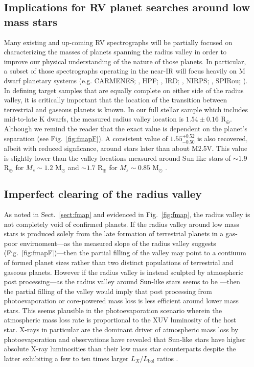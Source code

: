 \documentclass[twocolumn]{emulateapj}
\begin{document}
\subsection{Implications for RV planet searches around low mass stars}
Many existing and up-coming RV spectrographs
will be partially focused on characterizing the masses of planets spanning the radius valley in order to
improve our physical understanding of the nature of those planets. In particular, a subset of those spectrographs
operating in the near-IR will focus heavily on M dwarf planetary systems
(e.g. CARMENES; \citealt{quirrenbach14}, HPF; \citealt{mahadevan12}, IRD; \citealt{kotani14},
NIRPS; \citealt{bouchy17}, SPIRou; \citealt{donati18}). In defining target samples
that are equally complete on either side of the radius valley, it is critically important that the location
of the transition between terrestrial and gaseous planets is known. In our full stellar sample which includes
mid-to-late K dwarfs, the measured radius valley location is $1.54\pm 0.16$ R$_{\oplus}$. Although we remind the
reader that the exact value is dependent on the planet's separation (see Fig.~\ref{fig:fmapF}). A consistent value of
$1.55^{+0.52}_{-0.50}$ is also recovered, albeit with reduced signficance, around stars later than about M2.5V.
This value is slightly lower than the valley locations measured around Sun-like stars of
$\sim 1.9$ R$_{\oplus}$ for $M_s \sim 1.2$ M$_{\odot}$ and $\sim 1.7$ R$_{\oplus}$ for $M_s \sim 0.85$ M$_{\odot}$
\citep{fulton18}.

\subsection{Imperfect clearing of the radius valley} \label{sect:void}
As noted in Sect.~\ref{sect:fmap} and evidenced in Fig.~\ref{fig:fmap}, the radius valley is not completely
void of confirmed planets. If the radius valley around low mass stars is produced solely from the late formation
of terrestrial planets in a gas-poor envirnoment---as the measured slope of the radius valley suggests
(Fig.~\ref{fig:fmapF})---then the partial filling of the valley may point to a contiuum of formed planet sizes
rather than two distinct populations of terrestrial and gaseous planets. However if the radius valley is instead
sculpted by atmospheric post processing---as the radius valley around Sun-like stars seems to be
\citep{fulton17,fulton18,vaneylen18,martinez19}---then the partial filling of the valley would imply that post
processing from photoevaporation or core-powered mass loss is less efficient around lower mass stars.
This seems plausible in the photoevaporation scenario wherein the atmospheric mass loss rate is proportional to
the XUV luminosity of the host star. X-rays in particular are the dominant driver of atmospheric mass loss by
photoevaporation and observations have revealed that Sun-like stars have higher absolute X-ray luminosities than
their low mass star counterparts \citep{mcdonald19} despite the latter exhibiting a few to ten times larger
$L_X/L_{\text{bol}}$ ratios \citep{jackson12,shkolnik14}. 
\end{document}
